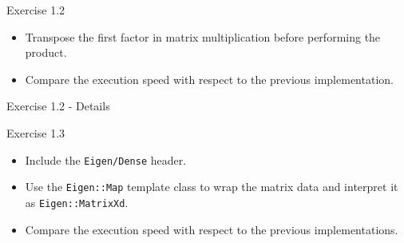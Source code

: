 \documentclass[10pt]{beamer}
\begin{document}
\begin{frame}{Exercise 1.2}
\begin{itemize}
\item Transpose the first factor in matrix multiplication before performing the product.
\item Compare the execution speed with respect to the previous implementation.
\end{itemize}
\end{frame}

\begin{frame}{Exercise 1.2 - Details}
\begin{figure}
    \centering
    \caption{}
\end{figure}
\end{frame}

\begin{frame}{Exercise 1.3}
\begin{itemize}
\item Include the {\tt Eigen/Dense} header.
\item Use the {\tt Eigen::Map} template class to wrap the matrix data and interpret it as {\tt Eigen::MatrixXd}.
\item Compare the execution speed with respect to the previous implementations.
\end{itemize}
\end{frame}
\end{document}
